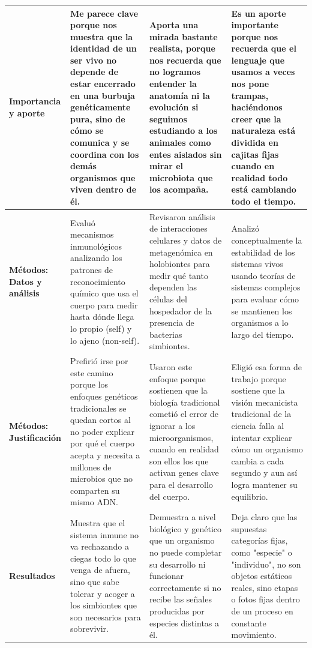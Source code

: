 \documentclass[12pt]{article}
\begin{document}
\begin{longtable}{|>{\raggedright\arraybackslash}p{3cm}|>{\raggedright\arraybackslash}p{4.2cm}|>{\raggedright\arraybackslash}p{4.2cm}|>{\raggedright\arraybackslash}p{4.2cm}|}
\hline
\textbf{Importancia y aporte} & Me parece clave porque nos muestra que la identidad de un ser vivo no depende de estar encerrado en una burbuja genéticamente pura, sino de cómo se comunica y se coordina con los demás organismos que viven dentro de él. & Aporta una mirada bastante realista, porque nos recuerda que no logramos entender la anatomía ni la evolución si seguimos estudiando a los animales como entes aislados sin mirar el microbiota que los acompaña. & Es un aporte importante porque nos recuerda que el lenguaje que usamos a veces nos pone trampas, haciéndonos creer que la naturaleza está dividida en cajitas fijas cuando en realidad todo está cambiando todo el tiempo. \\
\hline
\textbf{Métodos: Datos y análisis} & Evaluó mecanismos inmunológicos analizando los patrones de reconocimiento químico que usa el cuerpo para medir hasta dónde llega lo propio (self) y lo ajeno (non-self). & Revisaron análisis de interacciones celulares y datos de metagenómica en holobiontes para medir qué tanto dependen las células del hospedador de la presencia de bacterias simbiontes. & Analizó conceptualmente la estabilidad de los sistemas vivos usando teorías de sistemas complejos para evaluar cómo se mantienen los organismos a lo largo del tiempo. \\
\hline
\textbf{Métodos: Justificación} & Prefirió irse por este camino porque los enfoques genéticos tradicionales se quedan cortos al no poder explicar por qué el cuerpo acepta y necesita a millones de microbios que no comparten su mismo ADN. & Usaron este enfoque porque sostienen que la biología tradicional cometió el error de ignorar a los microorganismos, cuando en realidad son ellos los que activan genes clave para el desarrollo del cuerpo. & Eligió esa forma de trabajo porque sostiene que la visión mecanicista tradicional de la ciencia falla al intentar explicar cómo un organismo cambia a cada segundo y aun así logra mantener su equilibrio. \\
\hline
\textbf{Resultados} & Muestra que el sistema inmune no va rechazando a ciegas todo lo que venga de afuera, sino que sabe tolerar y acoger a los simbiontes que son necesarios para sobrevivir. & Demuestra a nivel biológico y genético que un organismo no puede completar su desarrollo ni funcionar correctamente si no recibe las señales producidas por especies distintas a él. & Deja claro que las supuestas categorías fijas, como "especie" o "individuo", no son objetos estáticos reales, sino etapas o fotos fijas dentro de un proceso en constante movimiento. \\

\end{longtable}
\end{document}
